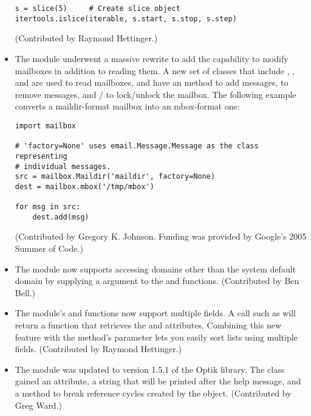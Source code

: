 \documentclass{howto}
\begin{document}
\begin{itemize}
\begin{verbatim}
s = slice(5)     # Create slice object
itertools.islice(iterable, s.start, s.stop, s.step)
\end{verbatim}

(Contributed by Raymond Hettinger.)

\item The  module underwent a massive rewrite to add
the capability to modify mailboxes in addition to reading them.  A new
set of classes that include , , and
 are used to read mailboxes, and have an
 method to add messages,
 to remove messages, and
/ to lock/unlock the mailbox.  The
following example converts a maildir-format mailbox into an mbox-format one:

\begin{verbatim}
import mailbox

# 'factory=None' uses email.Message.Message as the class representing
# individual messages.
src = mailbox.Maildir('maildir', factory=None)
dest = mailbox.mbox('/tmp/mbox')

for msg in src:
    dest.add(msg)
\end{verbatim}

(Contributed by Gregory K. Johnson.  Funding was provided by Google's
2005 Summer of Code.)

\item The  module now supports accessing domains other
than the system default domain by supplying a  argument to
the  and  functions.
(Contributed by Ben Bell.)

\item The  module's  
and  functions now support multiple fields.  
A call such as 
will return a function 
that retrieves the  and  attributes.  Combining 
this new feature with the  method's  parameter 
lets you easily sort lists using multiple fields.
(Contributed by Raymond Hettinger.)

\item The  module was updated to version 1.5.1 of the
Optik library.  The  class gained an
 attribute, a string that will be printed after the
help message, and a  method to break reference
cycles created by the object. (Contributed by Greg Ward.)


\end{itemize}
\end{document}
